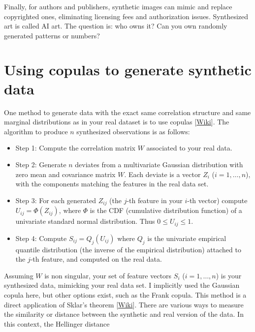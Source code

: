 \documentclass[oneside,10pt]{book}
\begin{document}
Finally, for authors and publishers, synthetic images can mimic and replace copyrighted ones, eliminating licensing fees and authorization issues.  Synthesized art is called \textcolor{index}{AI art}. The question is: who owns it? Can you own randomly generated patterns or numbers?


\section{Using copulas to generate synthetic data}\label{piviiiurobvbc}

One method to generate data with the exact same correlation structure and same marginal distributions as in your real dataset is to use \textcolor{index}{copulas} [\href{https://en.wikipedia.org/wiki/Copula_(probability_theory)}{Wiki}]. The algorithm to produce $n$ synthesized observations is as follows: \vspace{1ex}
\begin{itemize}
\item Step 1: Compute the correlation matrix $W$ associated to your real data.
\item Step 2: Generate $n$ deviates from a multivariate Gaussian distribution with zero mean and covariance matrix $W$. Each deviate is a 
 vector $Z_i$ ($i=1,\dots,n$), with the components matching the features in the real data set.
\item Step 3: For each generated $Z_{ij}$ (the $j$-th feature in your $i$-th vector) compute $U_{ij}=\Phi(Z_{ij})$, where $\Phi$ is
 the CDF (cumulative distribution function) of a univariate standard normal distribution. Thus $0\leq U_{ij}\leq 1$.
\item Step 4: Compute $S_{ij}=Q_j(U_{ij})$ where $Q_j$ is the univariate
\textcolor{index}{empirical quantile distribution} (the inverse of the \textcolor{index}{empirical distribution}) attached to the $j$-th feature, and computed on the real data.
\end{itemize}\vspace{1ex}
Assuming $W$ is non singular, your set of feature vectors $S_i$ ($i=1,\dots,n$) is your synthesized data, mimicking your real data set.
I implicitly used the \textcolor{index}{Gaussian copula} here, but other options exist, such as the 
\textcolor{index}{Frank copula}. This method is a direct application 
 of \textcolor{index}{Sklar's theorem} [\href{https://en.wikipedia.org/wiki/Copula_(probability_theory)#Sklar's_theorem}{Wiki}]. There are various ways to measure the similarity or distance between the synthetic and real version of the data. In this context, the \textcolor{index}{Hellinger distance} 
\end{document}
